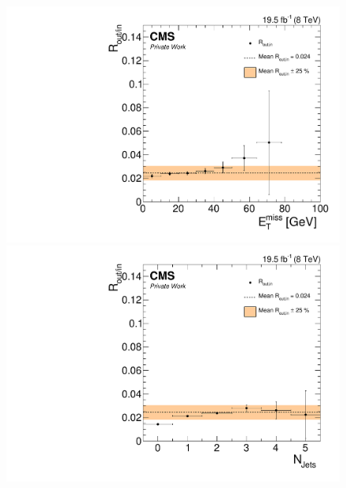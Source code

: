 \begin{figure}[htbp]
\centering
\begin{minipage}[t]{0.49\textwidth}
  \includegraphics[width=\textwidth]{plots/BG/rOutIn/rOutInSyst_DrellYanControlCentral_Full2012_MET_HighMass_EE_None.pdf}
\end{minipage}
\begin{minipage}[t]{0.49\textwidth}
\includegraphics[width=\textwidth]{plots/BG/rOutIn/rOutInSyst_DrellYanControlCentral_Full2012_NJets_HighMass_EE_None.pdf}
\end{minipage}
\begin{minipage}[t]{0.49\textwidth}

\end{minipage}
\end{figure}
